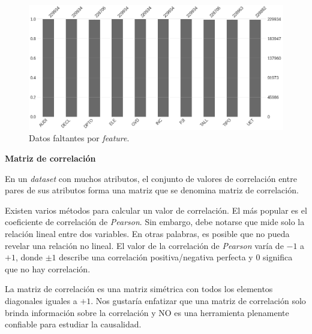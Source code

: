 \documentclass[a4paper,12pt]{article}
\begin{document}
		\begin{figure}[H]
			\begin{center}
				\includegraphics[width=1\textwidth]{tesis_66.png}
				\caption{Datos faltantes por \textit{feature}.}
				\label{fig:missingvalue}
			\end{center}
		\end{figure}
				
		\textbf{Matriz de correlación}
				
		En un \textit{dataset} con muchos atributos, el conjunto de valores de correlación entre pares de sus atributos forma una matriz que se denomina matriz de correlación.
				
		Existen varios métodos para calcular un valor de correlación. El más popular es el coeficiente de correlación de \textit{Pearson}. Sin embargo, debe notarse que mide solo la relación lineal entre dos variables. En otras palabras, es posible que no pueda revelar una relación no lineal. El valor de la correlación de \textit{Pearson} varía de $-1$ a $+1$, donde $\pm1$ describe una correlación positiva/negativa perfecta y $0$ significa que no hay correlación. \citep{corrmatrix}
				
		La matriz de correlación es una matriz simétrica con todos los elementos diagonales iguales a $+1$. Nos gustaría enfatizar que una matriz de correlación solo brinda información sobre la correlación y NO es una herramienta plenamente confiable para estudiar la causalidad. 
				
\end{document}
